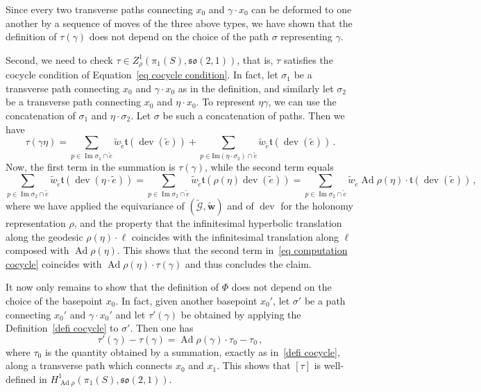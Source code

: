 \documentclass[11pt]{article}
\theoremstyle{definition}
\numberwithin{equation}{section}
\numberwithin{figure}{section}
\numberwithin{table}{section}
\newcommand{\so}{\mathfrak{so}}
\DeclareMathOperator{\dev}{dev}
\DeclareMathOperator{\Ad}{Ad}
\DeclareMathOperator{\Imm}{Im}
\begin{document}
Since every two transverse paths connecting $x_0$ and $\gamma\cdot x_0$ can be deformed to one another by a sequence of moves of the three above types, we have shown that the definition of $\tau(\gamma)$ does not depend on the choice of the path $\sigma$ representing $\gamma$.

Second, we need to check $\tau\in Z^1_\rho(\pi_1(S),\so(2,1))$, that is, $\tau$ satisfies the cocycle condition of Equation~\eqref{eq cocycle condition}. In fact, let $\sigma_1$ be a transverse path connecting $x_0$ and $\gamma\cdot x_0$ as in the definition, and similarly let $\sigma_2$ be a transverse path connecting $x_0$ and $\eta\cdot x_0$. To represent $\eta\gamma$, we can use the concatenation of $\sigma_1$ and $\eta\cdot \sigma_2$. Let $\sigma$ be such a concatenation of paths. Then we have
\begin{equation}\label{eq computation cocycle}
\tau(\gamma\eta)=\sum_{p\in \Imm\sigma_1\cap \widetilde e} \widetilde w_{\widetilde e} \mathfrak t(\dev(\widetilde e))+\sum_{p\in \mathrm{Im}(\eta\cdot\sigma_2)\cap \widetilde e} \widetilde w_{\widetilde e} \mathfrak t(\dev(\widetilde e))\,.
\end{equation}
Now, the first term in the summation is $\tau(\gamma)$, while the second term equals
\[
\sum_{p\in \Imm\sigma_2\cap \widetilde e} \widetilde w_{\widetilde e} \mathfrak t(\dev(\eta\cdot\widetilde e))=\sum_{p\in \Imm\sigma_2\cap \widetilde e} \widetilde w_{\widetilde e} \mathfrak t(\rho(\eta)\dev(\widetilde e))=\sum_{p\in \Imm\sigma_2\cap \widetilde e} \widetilde w_{\widetilde e} \Ad\rho(\eta)\cdot\mathfrak t(\dev(\widetilde e))\,,
\]
where we have applied the equivariance of $(\widetilde{\mathcal{G}},\widetilde{\mathbf w})$ and of $\dev$ for the holonomy representation $\rho$, and the property that the infinitesimal hyperbolic translation along the geodesic $\rho(\eta)\cdot \ell$ coincides with the infinitesimal translation along $\ell$ composed with $\Ad\rho(\eta)$. This shows that the second term in~\eqref{eq computation cocycle} coincides with $\Ad\rho(\eta)\cdot \tau(\gamma)$ and thus concludes the claim.

It now only remains to show that the definition of $\Phi$ does not depend on the choice of the basepoint $x_0$. In fact, given another basepoint $x_0'$, let $\sigma'$ be a path connecting $x_0'$ and $\gamma\cdot x_0'$ and let $\tau'(\gamma)$ be obtained by applying the Definition~\eqref{defi cocycle} to $\sigma'$. Then one has
\[
\tau'(\gamma)-\tau(\gamma)=\Ad\rho(\gamma)\cdot \tau_0-\tau_0\,,
\]
where $\tau_0$ is the quantity obtained by a summation, exactly as in~\eqref{defi cocycle}, along a transverse path which connects $x_0$ and $x_1$. This shows that $[\tau]$ is well-defined in $H^1_{\Ad\rho}(\pi_1(S),\so(2,1))$.
\end{document}

